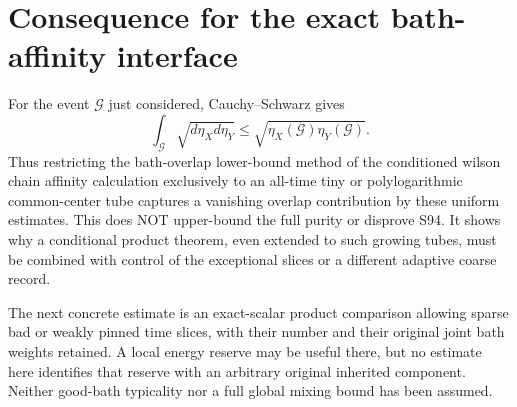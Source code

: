 \documentclass{article}
\begin{document}
\section*{Consequence for the exact bath-affinity interface}
For the event $\mathcal G$ just considered, Cauchy--Schwarz gives
\[
 \int_{\mathcal G}\sqrt{d\eta_Xd\eta_Y}
 \le\sqrt{\eta_X(\mathcal G)\eta_Y(\mathcal G)}.        \tag{8}
\]
Thus restricting the bath-overlap lower-bound method of the conditioned wilson chain affinity calculation exclusively to an all-time tiny or polylogarithmic common-center tube captures a vanishing overlap contribution by these uniform estimates. This does NOT upper-bound the full purity or disprove S94. It shows why a conditional product theorem, even extended to such growing tubes, must be combined with control of the exceptional slices or a different adaptive coarse record.

The next concrete estimate is an exact-scalar product comparison allowing sparse bad or weakly pinned time slices, with their number and their original joint bath weights retained. A local energy reserve may be useful there, but no estimate here identifies that reserve with an arbitrary original inherited component. Neither good-bath typicality nor a full global mixing bound has been assumed.
\end{document}
